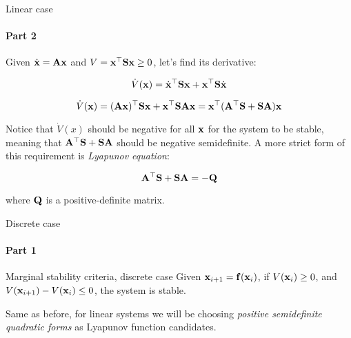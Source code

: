 \documentclass{beamer}
\begin{document}
\begin{frame}{Linear case}
\framesubtitle{Part 2}
\begin{flushleft}

Given $\dot{\mathbf{x}} = \mathbf{A}\mathbf{x}$ and $V = \mathbf{x}^\top\mathbf{S}\mathbf{x} \geq 0$, let's find its derivative:

\begin{equation}
    \dot V(\mathbf{x}) = \dot{\mathbf{x}}^\top\mathbf{S}\mathbf{x} + 
    \mathbf{x}^\top\mathbf{S}\dot{\mathbf{x}}
\end{equation}

\begin{equation}
    \dot V(\mathbf{x}) = (\mathbf{A}\mathbf{x})^\top\mathbf{S}\mathbf{x} + 
    \mathbf{x}^\top\mathbf{S}\mathbf{A}\mathbf{x} = 
    \mathbf{x}^\top(\mathbf{A}^\top\mathbf{S} + \mathbf{S}\mathbf{A})\mathbf{x}
\end{equation}

Notice that $\dot V(x)$ should be negative for all $\mathbf{x}$ for the system to be stable, meaning that $\mathbf{A}^\top\mathbf{S} + \mathbf{S}\mathbf{A}$ should be negative semidefinite. A more strict form of this requirement is \emph{Lyapunov equation}:

\begin{equation}
    \mathbf{A}^\top\mathbf{S} + \mathbf{S}\mathbf{A} = -\mathbf{Q}
\end{equation}

where $\mathbf{Q}$ is a positive-definite matrix.

\end{flushleft}
\end{frame}



\begin{frame}{Discrete case}
\framesubtitle{Part 1}
\begin{flushleft}

\begin{block}{Marginal stability criteria, discrete case}
Given $\mathbf{x}_{i+1} = \mathbf{f}(\mathbf{x}_i)$, if $V(\mathbf{x}_i) \geq 0$, and $V(\mathbf{x}_{i+1}) - V(\mathbf{x}_i) \leq 0$, the system is stable.
\end{block}

\bigskip 

Same as before, for linear systems we will be choosing \emph{positive semidefinite quadratic forms} as Lyapunov function candidates.

\end{flushleft}
\end{frame}
\end{document}

